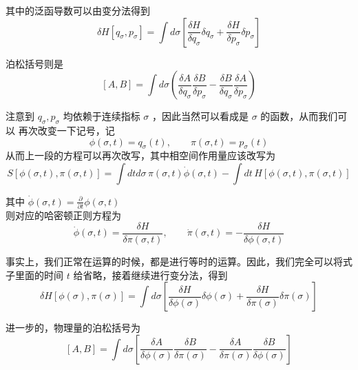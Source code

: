 其中的泛函导数可以由变分法得到
\begin{equation}
    \delta H\left[q_\sigma,p_\sigma\right] = \int d\sigma \left[\frac{\delta H}{\delta q_\sigma} \delta q_\sigma + \frac{\delta H}{\delta p_\sigma} \delta p_\sigma\right]
\end{equation}

泊松括号则是
\begin{equation}
    \left[A,B\right] = \int d\sigma \left(\frac{\delta A}{\delta q_\sigma}\frac{\delta B}{\delta p_\sigma} - \frac{\delta B}{\delta q_\sigma}\frac{\delta A}{\delta p_\sigma} \right)
\end{equation}

注意到 $q_\sigma,p_\sigma$ 均依赖于连续指标 $\sigma$ ，因此当然可以看成是 $\sigma$ 的函数，从而我们可以
再次改变一下记号，记 
\begin{equation}
    \phi(\sigma,t) = q_\sigma(t),\qquad \pi(\sigma,t) = p_\sigma(t)
\end{equation}
从而上一段的方程可以再次改写，其中相空间作用量应该改写为
\begin{equation}
    S[\phi(\sigma,t),\pi(\sigma,t)] = \int dtd\sigma\, \pi(\sigma,t)\dot{\phi}(\sigma,t) - \int dt\, H[\phi(\sigma,t), \pi(\sigma,t)]
\end{equation}

其中 $\displaystyle \dot{\phi}(\sigma,t) = \frac{\partial}{\partial t} \phi(\sigma,t)$ \\
则对应的哈密顿正则方程为
\begin{equation}
    \dot{\phi}(\sigma,t) = \frac{\delta H}{\delta \pi (\sigma,t)} , \qquad \dot{\pi}(\sigma,t) = - \frac{\delta H}{\delta \phi(\sigma,t)}
\end{equation}

事实上，我们正常在运算的时候，都是进行等时的运算。因此，我们完全可以将式子里面的时间 $t$ 给省略，接着继续进行变分法，得到
\begin{equation}
    \delta H\left[\phi(\sigma),\pi(\sigma)\right] = \int d\sigma \left[\frac{\delta H}{\delta \phi(\sigma)}\delta \phi(\sigma) + \frac{\delta H}{\delta \pi(\sigma)}\delta \pi(\sigma)\right]
\end{equation}

进一步的，物理量的泊松括号为
\begin{equation}
    \left[A,B\right] = \int d\sigma \left[\frac{\delta A}{\delta \phi(\sigma)}\frac{\delta B}{\delta \pi(\sigma)} - \frac{\delta A}{\delta \pi(\sigma)}\frac{\delta B}{\delta \phi(\sigma)}\right]
\end{equation}


